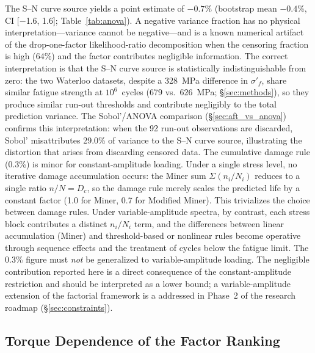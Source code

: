 \documentclass[12pt,a4paper]{article}
\begin{document}
The S--N curve source yields a point estimate of $-0.7$\% (bootstrap
mean $-0.4$\%, CI [$-$1.6, 1.6]; Table~\ref{tab:anova}). A negative
variance fraction has no physical interpretation---variance cannot be
negative---and is a known numerical artifact of the
drop-one-factor likelihood-ratio decomposition when the censoring
fraction is high (64\%) and the factor contributes negligible
information. The correct interpretation is that the S--N curve source
is statistically indistinguishable from zero: the two Waterloo
datasets, despite a 328~MPa difference in $\sigma'_f$, share similar
fatigue strength at $10^6$~cycles (679 vs.\ 626~MPa; \S\ref{sec:methods}),
so they produce similar run-out thresholds and contribute negligibly
to the total prediction variance. The Sobol'/ANOVA comparison
(\S\ref{sec:aft_vs_anova}) confirms this interpretation: when the 92
run-out observations are discarded, Sobol' misattributes 29.0\% of
variance to the S--N curve source, illustrating the distortion that
arises from discarding censored data. The cumulative damage rule
(0.3\%) is minor for constant-amplitude loading. Under a single
stress level,
no iterative damage accumulation occurs: the Miner sum
$\Sigma(n_i/N_i)$ reduces to a single ratio $n/N = D_c$, so the
damage rule merely scales the predicted life by a constant factor
(1.0 for Miner, 0.7 for Modified Miner). This trivializes the
choice between damage rules. Under variable-amplitude spectra,
by contrast, each stress block contributes a distinct $n_i/N_i$
term, and the differences between linear accumulation (Miner) and
threshold-based or nonlinear rules become operative through sequence
effects and the treatment of cycles below the fatigue limit. The
0.3\% figure must \emph{not} be generalized to
variable-amplitude loading.
The negligible contribution reported here is a direct consequence of
the constant-amplitude restriction and should be interpreted as a
lower bound; a variable-amplitude extension of the factorial
framework is a addressed in Phase~2 of the research roadmap (\S\ref{sec:constraints}).

\subsection{Torque Dependence of the Factor Ranking}
\label{sec:torque}
\end{document}

